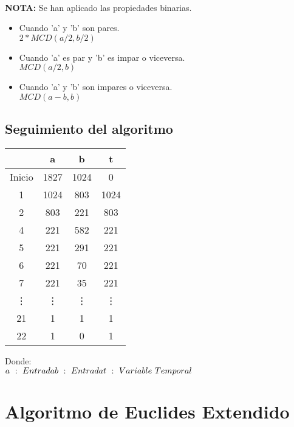 \documentclass[11pt, conference]{IEEEtran}
\begin{document}
\

\textbf{NOTA:} Se han aplicado las propiedades binarias.
\begin{itemize}
	\item Cuando 'a' y 'b' son pares. \\
		  $2*MCD(a/2,b/2)$
	\item Cuando 'a' es par y 'b' es impar o viceversa. \\
		  $MCD(a/2,b)$
	\item Cuando 'a' y 'b' son impares o viceversa. \\
		  $MCD(a-b,b)$
\end{itemize}

\pagebreak

\subsection{Seguimiento del algoritmo}

\begin{center}
	\begin{tabular}{|c|c|c|c|}
		\hline
		& \textbf{a}& \textbf{b} & \textbf{t}\\	\hline
		Inicio & 1827 & 1024 & 0\\ \hline
		1 & 1024 & 803 & 1024\\ \hline
		2 & 803 & 221 & 803 \\ \hline
		4 & 221 & 582 & 221 \\ \hline
		5 & 221 & 291 & 221 \\ \hline
		6 & 221 & 70 & 221 \\ \hline
		7 & 221 & 35 & 221 \\ \hline
		\vdots & \vdots & \vdots& \vdots\\ \hline
		21 & 1 & 1 & 1\\ \hline
		22 & 1 & 0 & 1\\ \hline
	\end{tabular}
\end{center}
Donde:\\
$
a\ :\ Entrada \\
b\ :\ Entrada \\	
t\ :\ Variable\ Temporal
$

\section{Algoritmo de Euclides Extendido}
\end{document}
